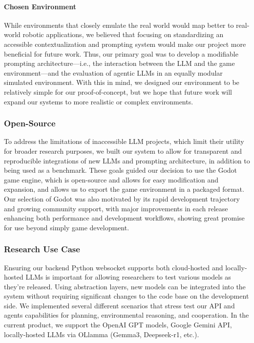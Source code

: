\documentclass{article}
\begin{document}
\paragraph{Chosen Environment} While environments that closely emulate the real world would map better to real-world robotic applications, we believed that focusing on standardizing an accessible contextualization and prompting system would make our project more beneficial for future work.
Thus, our primary goal was to develop a modifiable prompting architecture---i.e., the interaction between the LLM and the game environment---and the evaluation of agentic LLMs in an equally modular simulated environment.
With this in mind, we designed our environment to be relatively simple for our proof-of-concept, but we hope that future work will expand our systems to more realistic or complex environments.

\subsubsection{Open-Source}
To address the limitations of inaccessible LLM projects, which limit their utility for broader research purposes, we built our system to allow for transparent and reproducible integrations of new LLMs and prompting architecture, in addition to being used as a benchmark.
These goals guided our decision to use the Godot game engine, which is open-source and allows for easy modification and expansion, and allows us to export the game environment in a packaged format.
Our selection of Godot was also motivated by its rapid development trajectory and growing community support, with major improvements in each release enhancing both performance and development workflows, showing great promise for use beyond simply game development.

\subsubsection{Research Use Case}
Ensuring our backend Python websocket supports both cloud-hosted and locally-hosted LLMs is important for allowing researchers to test various models as they're released.
Using abstraction layers, new models can be integrated into the system without requiring significant changes to the code base on the development side.
We implemented several different scenarios that stress test our API and agents capabilities for planning, environmental reasoning, and cooperation.
In the current product, we support the OpenAI GPT models, Google Gemini API, locally-hosted LLMs via OLlamma (Gemma3, Deepseek-r1, etc.).
\end{document}

